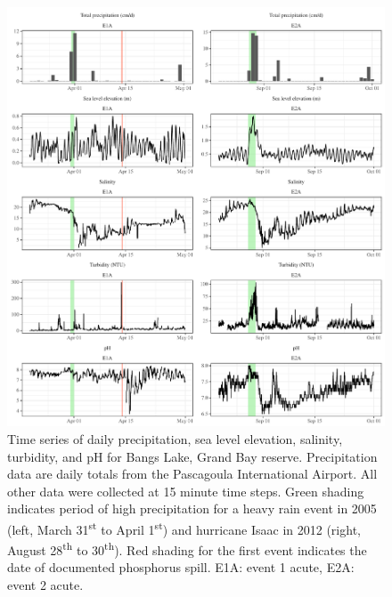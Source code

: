 \documentclass[letterpaper,12pt]{article}\usepackage[]{graphicx}\usepackage[]{color}
\makeatletter
\def\maxwidth{ %
  \ifdim\Gin@nat@width>\linewidth
    \linewidth
  \else
    \Gin@nat@width
  \fi
}
\makeatother
\begin{document}
\begin{figure}[!ht]

{\centering \includegraphics[width=\maxwidth]{figs/Fig3} 

}

\caption[Time series of daily precipitation, sea level elevation, salinity, turbidity, and pH for Bangs Lake, Grand Bay reserve]{Time series of daily precipitation, sea level elevation, salinity, turbidity, and pH for Bangs Lake, Grand Bay reserve.  Precipitation data are daily totals from the Pascagoula International Airport.  All other data were collected at 15 minute time steps.  Green shading indicates period of high precipitation for a heavy rain event in 2005 (left, March 31\textsuperscript{st} to April 1\textsuperscript{st}) and hurricane Isaac in 2012 (right, August 28\textsuperscript{th} to 30\textsuperscript{th}).  Red shading for the first event indicates the date of documented phosphorus spill.  E1A: event 1 acute, E2A: event 2 acute.}\label{fig:Fig3}
\end{figure}


\clearpage
\end{document}
